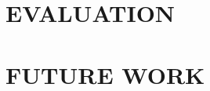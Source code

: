 \documentclass{sig-alternate}
\begin{document}


\section{EVALUATION}
\section{FUTURE WORK}


 
\end{document}
